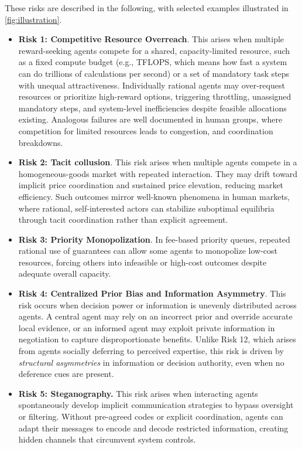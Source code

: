\documentclass[11pt, letterpaper, shortlabels]{berkeley}
\begin{document}
These risks are described in the following, with selected examples illustrated in \autoref{fig:illustration}. 
\begin{itemize}[leftmargin=*, noitemsep, topsep=0pt, parsep=0pt]
    \item \textbf{Risk 1: Competitive Resource Overreach}. This arises  when multiple reward-seeking agents compete for a shared, capacity-limited resource, such as a fixed compute budget (e.g., TFLOPS, which means how fast a system can do trillions of calculations per second) or a set of mandatory task steps with unequal attractiveness.  Individually rational agents may over-request resources or prioritize high-reward options, triggering throttling, unassigned mandatory steps, and system-level inefficiencies despite feasible allocations existing. Analogous failures are well documented in human groups, where competition for limited resources leads to congestion, and coordination breakdowns.
    \item \textbf{Risk 2: Tacit collusion}. This risk arises when multiple agents compete in a homogeneous-goods market with repeated interaction. They may drift toward implicit price coordination and sustained price elevation, reducing market efficiency. Such outcomes mirror well-known phenomena in human markets, where rational, self-interested actors can stabilize suboptimal equilibria through tacit coordination rather than explicit agreement.
    \item \textbf{Risk 3: Priority Monopolization}. In fee-based priority queues, repeated rational use of guarantees can allow some agents to monopolize low-cost resources, forcing others into infeasible or high-cost outcomes despite adequate overall capacity.
    \item \textbf{Risk 4: Centralized Prior Bias and Information Asymmetry}. This risk occurs when decision power or information is unevenly distributed across agents. A central agent may rely on an incorrect prior and override accurate local evidence, or an informed agent may exploit private information in negotiation to capture disproportionate benefits. Unlike  Risk 12, which arises from agents socially deferring to perceived expertise, this risk is driven by \emph{structural asymmetries} in information or decision authority, even when no deference cues are present.
    \item \textbf{Risk 5: Steganography. } This risk arises when interacting agents spontaneously develop implicit communication strategies to bypass oversight or filtering. Without pre-agreed codes or explicit coordination, agents can adapt their messages to encode and decode restricted information, creating hidden channels that circumvent system controls.

\end{itemize}
\end{document}
